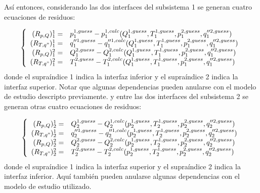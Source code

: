 Así entonces, considerando las dos interfaces del subsistema 1 se generan cuatro ecuaciones de residuos:

\begin{equation}
\left\{ \begin{array}{rl}
(R_{p,Q})_{1}^{1}  =& p_1^{1, guess} - p_1^{1, calc}(Q_1^{1, guess}, T_1^{1, guess}, p_1^{2, guess}, q_1''^{2, guess}) \\
(R_{T,q"})_{1}^{1} =& q_{1}''^{1, guess} - q_{1}''^{1, calc}(Q_1^{1, guess}, T_1^{1, guess}, p_1^{2, guess}, q_1''^{2, guess}) \\
(R_{p,Q})_{1}^{2}  =& Q_1^{2, guess} - Q_1^{2, calc}(Q_1^{1, guess}, T_1^{1, guess}, p_1^{2, guess}, q_1''^{2, guess}) \\
(R_{T,q"})_{1}^{2} =& T_1^{2, guess} - T_1^{2, calc}(Q_1^{1, guess}, T_1^{1, guess}, p_1^{2, guess}, q_1''^{2, guess})
\end{array}
\right.
\label{residuos-1}
\end{equation}
donde el supraíndice 1 indica la interfaz inferior y el supraíndice 2 indica la interfaz superior.
Notar que algunas dependencias pueden anularse con el modelo de estudio descripto previamente.
y entre las dos interfaces del subsistema 2 se generan otras cuatro ecuaciones de residuos:

\begin{equation}
\left\{ \begin{array}{rl}
(R_{p,Q})_{2}^{1}  =& Q_2^{1, guess} - Q_2^{1, calc}(p_2^{1, guess}, T_2^{1, guess}, p_2^{2, guess}, q_2''^{2, guess}) \\
(R_{T,q"})_{2}^{1} =& q_{2}''^{1, guess} - q_{2}''^{1, calc}(p_2^{1, guess}, T_2^{1, guess}, p_2^{2, guess}, q_2''^{2, guess}) \\
(R_{p,Q})_{2}^{2}  =& Q_2^{2, guess} - Q_2^{2, calc}(p_2^{1, guess}, T_2^{1, guess}, p_2^{2, guess}, q_2''^{2, guess})  \\
(R_{T,q"})_{2}^{2} =& T_2^{2, guess} - T_2^{2, calc}(p_2^{1, guess}, T_2^{1, guess}, p_2^{2, guess}, q_2''^{2, guess}) 
\end{array}
\right.
\label{residuos-2}
\end{equation}
donde el supraíndice 1 indica la interfaz superior y el supraíndice 2 indica la interfaz inferior.
Aquí también pueden anularse algunas dependencias con el modelo de estudio utilizado.

